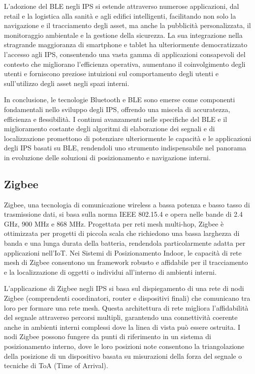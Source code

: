 L'adozione del BLE negli IPS si estende attraverso numerose applicazioni, dal retail e la logistica alla sanità e agli edifici intelligenti, facilitando non solo la navigazione e il tracciamento degli asset, ma anche la pubblicità personalizzata, il monitoraggio ambientale e la gestione della sicurezza. La sua integrazione nella stragrande maggioranza di smartphone e tablet ha ulteriormente democratizzato l'accesso agli IPS, consentendo una vasta gamma di applicazioni consapevoli del contesto che migliorano l'efficienza operativa, aumentano il coinvolgimento degli utenti e forniscono preziose intuizioni sul comportamento degli utenti e sull'utilizzo degli asset negli spazi interni.

In conclusione, le tecnologie Bluetooth e BLE sono emerse come componenti fondamentali nello sviluppo degli IPS, offrendo una miscela di accuratezza, efficienza e flessibilità. I continui avanzamenti nelle specifiche del BLE e il miglioramento costante degli algoritmi di elaborazione dei segnali e di localizzazione promettono di potenziare ulteriormente le capacità e le applicazioni degli IPS basati su BLE, rendendoli uno strumento indispensabile nel panorama in evoluzione delle soluzioni di posizionamento e navigazione interni.

\subsection{Zigbee}
\hspace{\parindent}Zigbee, una tecnologia di comunicazione wireless a bassa potenza e basso tasso di trasmissione dati, si basa sulla norma IEEE 802.15.4 e opera nelle bande di 2.4 GHz, 900 MHz e 868 MHz. Progettata per reti mesh multi-hop, Zigbee è ottimizzata per progetti di piccola scala che richiedono una bassa larghezza di banda e una lunga durata della batteria, rendendola particolarmente adatta per applicazioni nell'IoT. Nei Sistemi di Posizionamento Indoor, le capacità di rete mesh di Zigbee consentono un framework robusto e affidabile per il tracciamento e la localizzazione di oggetti o individui all'interno di ambienti interni.

L'applicazione di Zigbee negli IPS si basa sul dispiegamento di una rete di nodi Zigbee (comprendenti coordinatori, router e dispositivi finali) che comunicano tra loro per formare una rete mesh. Questa architettura di rete migliora l'affidabilità del segnale attraverso percorsi multipli, garantendo una connettività coerente anche in ambienti interni complessi dove la linea di vista può essere ostruita. I nodi Zigbee possono fungere da punti di riferimento in un sistema di posizionamento interno, dove le loro posizioni note consentono la triangolazione della posizione di un dispositivo basata su misurazioni della forza del segnale o tecniche di ToA (Time of Arrival).

